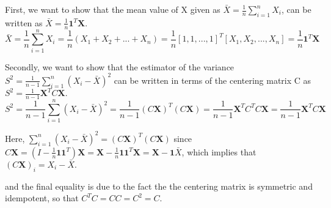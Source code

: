 First, we want to show that the mean value of X given as $\bar X = \frac{1}{n} \sum_{i=1}^{n} X_i$, can be written as $\bar X = \frac{1}{n} \textbf{1}^T \textbf{X}$. 
$$
\bar X = \frac{1}{n} \sum_{i=1}^{n} X_i = \frac{1}{n} (X_1 + X_2 + ... + X_n) = \frac{1}{n} [1, 1, ..., 1]^T [X_1, X_2, ..., X_n]= \frac{1}{n} \textbf{1}^T \textbf{X}
$$

Secondly, we want to show that the estimator of the variance $S^2 = \frac{1}{n-1}  \sum_{i=1}^{n} (X_i - \bar X)^2$ can be written in terms of the centering matrix C as  $S^2 = \frac{1}{n-1} \textbf{X}^T C \textbf{X}.$
$$
S^2 = \frac{1}{n-1}  \sum_{i=1}^{n} (X_i - \bar X)^2 = \frac{1}{n-1} (C\textbf{X})^T (C\textbf{X}) = \frac{1}{n-1} \textbf{X}^T C^T C \textbf{X} =  \frac{1}{n-1} \textbf{X}^T C \textbf{X}
$$

Here, $\sum_{i=1}^{n} (X_i - \bar X)^2 = (C\textbf{X})^T (C\textbf{X})$ since $C\textbf{X} = \left(I-\frac{1}{n}\boldsymbol{1}\boldsymbol{1}^T\right)\textbf{X} = \textbf{X}-\frac{1}{n}\boldsymbol{1}\boldsymbol{1}^T\textbf{X} = \textbf{X}-\boldsymbol{1}\bar{X}$, which implies that $\left(C\textbf{X}\right)_i = X_i - \bar{X}.$

and the final equality is due to the fact the the centering matrix is symmetric and idempotent, so that $C^T C = CC = C^2 = C$.  


